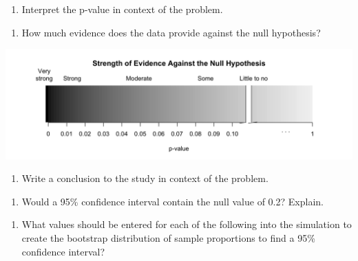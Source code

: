 \documentclass[
]{report}
\providecommand{\tightlist}{%
  \setlength{\itemsep}{0pt}\setlength{\parskip}{0pt}}
\begin{document}
\begin{enumerate}
\def\labelenumi{\arabic{enumi}.}
\setcounter{enumi}{6}
\tightlist
\item
  Interpret the p-value in context of the problem.
\end{enumerate}

\vspace{1in}

\begin{enumerate}
\def\labelenumi{\arabic{enumi}.}
\setcounter{enumi}{7}
\tightlist
\item
  How much evidence does the data provide against the null hypothesis?
\end{enumerate}

\begin{center}\includegraphics[width=0.9\linewidth]{images/soe_gradient_gray} \end{center}

\vspace{0.2in}

\begin{enumerate}
\def\labelenumi{\arabic{enumi}.}
\setcounter{enumi}{8}
\tightlist
\item
  Write a conclusion to the study in context of the problem.
\end{enumerate}

\vspace{0.8in}

\begin{enumerate}
\def\labelenumi{\arabic{enumi}.}
\setcounter{enumi}{9}
\tightlist
\item
  Would a 95\% confidence interval contain the null value of 0.2? Explain.
\end{enumerate}

\vspace{0.8in}

\begin{enumerate}
\def\labelenumi{\arabic{enumi}.}
\setcounter{enumi}{10}
\tightlist
\item
  What values should be entered for each of the following into the simulation to create the bootstrap distribution of sample proportions to find a 95\% confidence interval?
  \vspace{1mm}
\end{enumerate}
\end{document}
